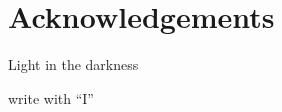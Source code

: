 \thispagestyle{empty}
\vspace{-3cm}
\section*{\centering Acknowledgements}

Light in the darkness

write with \enquote{I}

\thispagestyle{empty}


\newpage

